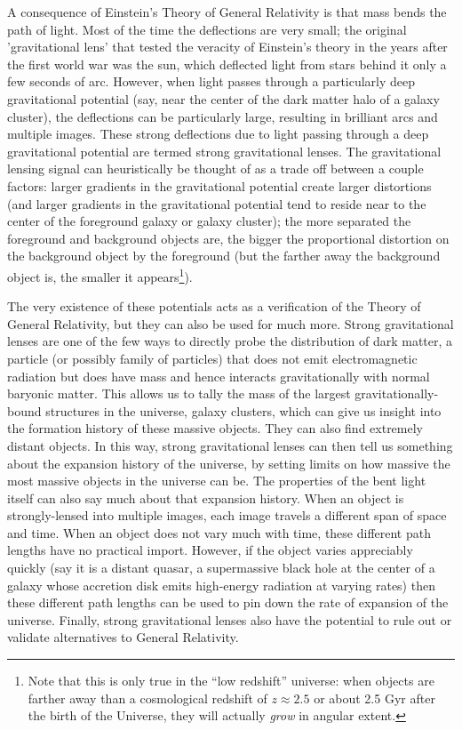\documentclass[10pt,twocolumn,letterpaper]{article}
\begin{document}
A consequence of Einstein's Theory of General Relativity is that mass bends the
path of light. \cite{Einstein:2007aa} Most of the time the deflections are very
small; the original 'gravitational lens' that tested the veracity of Einstein's
theory in the years after the first world war was the sun, which deflected
light from stars behind it only a few seconds of arc. However, when light
passes through a particularly deep gravitational potential (say, near the
center of the dark matter halo of a galaxy cluster), the deflections can be
particularly large, resulting in brilliant arcs and multiple images. These
strong deflections due to light passing through a deep gravitational potential
are termed strong gravitational lenses. The gravitational lensing signal can
heuristically be thought of as a trade off between a couple factors: larger
gradients in the gravitational potential create larger distortions (and larger
gradients in the gravitational potential tend to reside near to the center of
the foreground galaxy or galaxy cluster); the more separated the foreground and
background objects are, the bigger the proportional distortion on the
background object by the foreground (but the farther away the background object
is, the smaller it appears\footnote{Note that this is only true in the ``low
  redshift'' universe: when objects are farther away than a cosmological
redshift of $z \approx 2.5$ or about 2.5 Gyr after the birth of the Universe,
they will actually \textit{grow} in angular extent.}). \cite{Kochanek:2006oz}

The very existence of these potentials acts as a verification of the Theory of
General Relativity, but they can also be used for much more. Strong
gravitational lenses are one of the few ways to directly probe the distribution
of dark matter, a particle (or possibly family of particles) that does not emit
electromagnetic radiation but does have mass and hence interacts
gravitationally with normal baryonic matter. \cite{Refsdal:1964aa} This allows
us to tally the mass of the largest gravitationally-bound structures in the
universe, galaxy clusters, which can give us insight into the formation history
of these massive objects. \cite{Oguri:2010aa} They can also find extremely
distant objects. \cite{Hezaveh:2014aa} In this way, strong gravitational lenses
can then tell us something about the expansion history of the universe, by
setting limits on how massive the most massive objects in the universe can be.
The properties of the bent light itself can also say much about that expansion
history. \cite{Refsdal:1964ab, Kundic:1997aa, Gonzalez:2012aa, Barnacka:2014aa,
Hojjati:2014aa, Suyu:2014aa} When an object is strongly-lensed into multiple
images, each image travels a different span of space and time. When an object
does not vary much with time, these different path lengths have no practical
import. However, if the object varies appreciably quickly (say it is a distant
quasar, a supermassive black hole at the center of a galaxy whose accretion
disk emits high-energy radiation at varying rates) then these different path
lengths can be used to pin down the rate of expansion of the universe. Finally,
strong gravitational lenses also have the potential to rule out or validate
alternatives to General Relativity. \cite{Troxel:2014aa}
\end{document}
